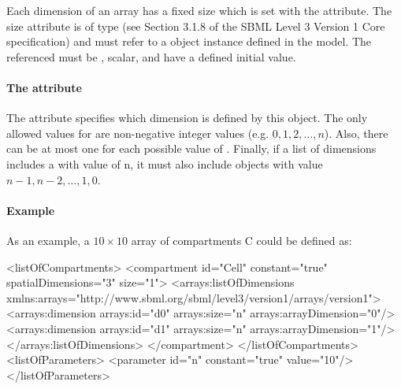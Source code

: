 Each dimension of an array has a fixed size which is set with the  attribute.   The size attribute is of type   (see Section 3.1.8 of the SBML Level 3 Version 1 Core specification) and must refer to a \Parameter object instance defined in the model.   The \Parameter referenced must be , scalar, and have a defined initial value.

\paragraph{The  attribute}

The  attribute specifies which dimension is defined by this \Dimension object.    
The only allowed values for  are non-negative integer values (e.g. $0,1,2,\dots,n$).   Also, there can be at most one \Dimension for each possible value of .   
Finally, if a list of dimensions includes a \Dimension with  value of n, it must also
include \Dimension objects with value $n-1, n-2, \dots , 1, 0$.

\paragraph{Example}

As an example, a $10 \times 10$ array of compartments C could be defined as:

\begin{example}
<listOfCompartments>
    <compartment id="Cell" constant="true" spatialDimensions="3" size="1">
        <arrays:listOfDimensions
            xmlns:arrays="http://www.sbml.org/sbml/level3/version1/arrays/version1">
            <arrays:dimension arrays:id="d0" arrays:size="n" arrays:arrayDimension="0"/>
            <arrays:dimension arrays:id="d1" arrays:size="n" arrays:arrayDimension="1"/>
        </arrays:listOfDimensions>
    </compartment>
</listOfCompartments>
<listOfParameters>
    <parameter id="n" constant="true" value="10"/>
</listOfParameters>
\end{example}

